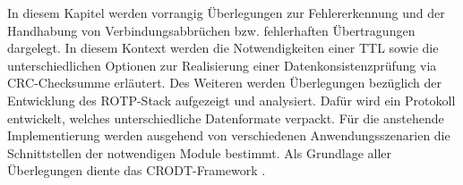 \label{cap:konzept}

In diesem Kapitel werden vorrangig {\"U}berlegungen zur Fehlererkennung
und der Handhabung von Verbindungsabbr{\"u}chen bzw. fehlerhaften
{\"U}bertragungen dargelegt. In diesem Kontext werden die Notwendigkeiten einer
\gls{TTL} sowie die unterschiedlichen Optionen zur
Realisierung einer Datenkonsistenzpr{\"u}fung via CRC-Checksumme erl{\"a}utert.
Des Weiteren werden {\"U}berlegungen bez{\"u}glich der Entwicklung des
\gls{ROTP}-Stack aufgezeigt und analysiert. Dafür wird ein Protokoll
entwickelt, welches unterschiedliche Datenformate verpackt. Für die anstehende
Implementierung werden ausgehend von verschiedenen Anwendungsszenarien die
Schnittstellen der notwendigen Module bestimmt. Als Grundlage aller
{\"U}berlegungen diente das \gls{CRODT}-Framework \cite{Daher}.

